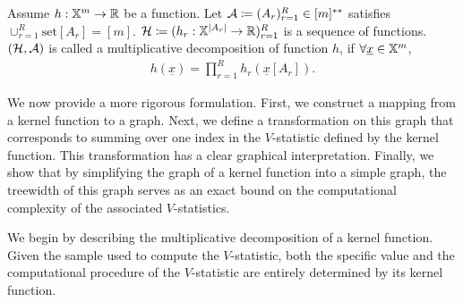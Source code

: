 \documentclass[letterpaper,11pt]{article}
\newcommand{\Lin}[1]{{\color{purple}{Lin: #1}}}
\newcommand{\samplespace}{\bbX}
\newcommand{\takesetp}[1]{\mathrm{set}[#1]}
\newcommand{\perm}[1]{\mathrm{Perm}(#1)}
\newcommand{\cover}{\mathcal{C}}
\begin{document}
\begin{definition}\label{def:multiplicative_decomposition}
Assume $h : \samplespace^m \to \reals$ be a function. Let ${\mathcal{A}} \coloneqq (A_r)_{r=1}^R \in [m]^{**}$ satisfies $\cup_{r=1}^R \takesetp{A_r} = [m]$. $\calH \coloneqq (h_r : \samplespace^{|A_r|} \to \reals)_{r=1}^R$ is a sequence of functions. $({\mathcal{H}}, {\mathcal{A}})$ is called a multiplicative decomposition of function $h$, if $\forall \underline{x} \in \samplespace^m$, 
\begin{align*}
    h(\underline{x}) = \prod_{r=1}^R h_r(\underline{x}[A_r]). 
\end{align*}
\end{definition}

We now provide a more rigorous formulation. First, we construct a mapping from a kernel function to a graph. Next, we define a transformation on this graph that corresponds to summing over one index in the $V$-statistic defined by the kernel function. This transformation has a clear graphical interpretation. Finally, we show that by simplifying the graph of a kernel function into a simple graph, the treewidth of this graph serves as an exact bound on the computational complexity of the associated $V$-statistics.

We begin by describing the multiplicative decomposition of a kernel function. \Lin{we probably should check if such a concept has been defined somewhere in math literature} Given the sample used to compute the $V$-statistic, both the specific value and the computational procedure of the $V$-statistic are entirely determined by its kernel function. 


\end{document}

